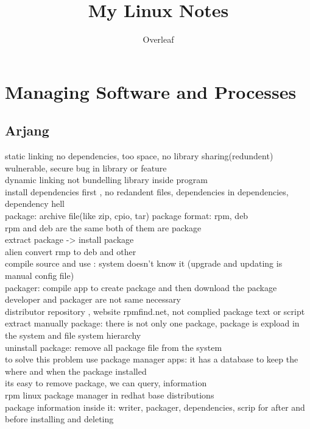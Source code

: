 \documentclass{book}
\begin{document}
	\title{My Linux Notes}
	\maketitle
	\author{Overleaf}
	\pagebreak
	\tableofcontents
	\pagebreak
	\chapter{Managing Software and Processes}
	\section{Arjang}
	static linking no dependencies, too space, no library sharing(redundent) wulnerable, secure bug in library  or feature\\
	dynamic linking not bundelling library inside program\\
	install dependencies first , no redandent files, dependencies in dependencies, dependency hell \\
	package: archive file(like zip, cpio, tar)
	package format: rpm, deb \\
	rpm and deb are the same both of them are package\\
	extract package -> install package\\
	alien convert rmp to deb and other\\
	compile source and use : system doesn't know it (upgrade and updating is manual config file)\\
	packager: compile app to create package and then download the package \\
	developer and packager are not same necessary\\
	distributor repository  , website rpmfind.net, 
	not complied package text or script\\
	extract manually package: there is not only one package, package is expload in the system and file system hierarchy \\
	uninstall package: remove all package file from the system\\
	to solve this problem use package manager apps: it has a database to keep the where and when the package installed\\
	its easy to remove package, we can query, information\\
	rpm linux package manager in redhat base distributions\\
	package information inside it: writer, packager, dependencies, scrip for after and before installing and deleting\\
\end{document}
